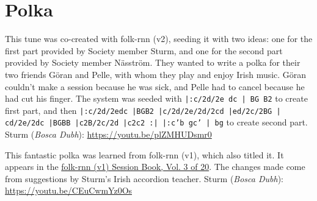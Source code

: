 \documentclass[a4paper,notitlepage,twoside]{book}
\begin{document}
\section{Polka}
{}  
 
\hypertarget{polka:GoranPelle}{}
This tune was co-created with folk-rnn (v2), seeding it with two ideas: 
one for the first part provided by Society member Sturm, 
and one for the second part provided by Society member Näsström. 
They wanted to write a polka for their two friends Göran and Pelle, 
with whom they play and enjoy Irish music. 
Göran couldn't make a session because he was sick, 
and Pelle had to cancel because he had cut his finger.
The system was seeded with {\tt |:c/2d/2e dc | BG B2} to create first part,
and then 
{\tt |:c/2d/2edc |BGB2 |c/2d/2e/2d/2cd |ed/2c/2BG | cd/2e/2dc |BGBB |c2B/2c/2d |c2c2 :| |:c'b gc' | bg}
to create second part.
Sturm ({\em Bosca Dubh}): \url{https://youtu.be/plZMHUDsmr0}

{}  
  
\hypertarget{polka:WilliamMurphys}{}
This fantastic polka was learned from folk-rnn (v1), which also titled it.
It appears in the \href{https://highnoongmt.wordpress.com/2018/01/05/volumes-1-20-of-folk-rnn-v1-transcriptions}{folk-rnn (v1) Session Book, Vol. 3 of 20}.
The changes made come from suggestions by Sturm's Irish accordion teacher.
Sturm ({\em Bosca Dubh}): \url{https://youtu.be/CEuCwmYz0Os}
\end{document}
